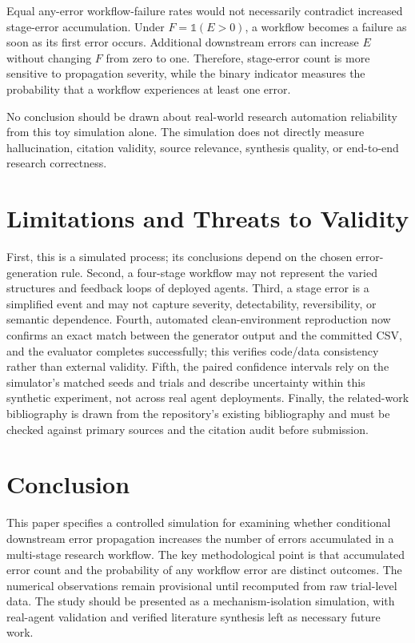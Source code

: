 \documentclass[conference]{IEEEtran}
\begin{document}
Equal any-error workflow-failure rates would not necessarily contradict increased stage-error accumulation. Under $F=\mathbb{1}(E>0)$, a workflow becomes a failure as soon as its first error occurs. Additional downstream errors can increase $E$ without changing $F$ from zero to one. Therefore, stage-error count is more sensitive to propagation severity, while the binary indicator measures the probability that a workflow experiences at least one error.

No conclusion should be drawn about real-world research automation reliability from this toy simulation alone. The simulation does not directly measure hallucination, citation validity, source relevance, synthesis quality, or end-to-end research correctness.

\section{Limitations and Threats to Validity}
First, this is a simulated process; its conclusions depend on the chosen error-generation rule. Second, a four-stage workflow may not represent the varied structures and feedback loops of deployed agents. Third, a stage error is a simplified event and may not capture severity, detectability, reversibility, or semantic dependence. Fourth, automated clean-environment reproduction now confirms an exact match between the generator output and the committed CSV, and the evaluator completes successfully; this verifies code/data consistency rather than external validity. Fifth, the paired confidence intervals rely on the simulator's matched seeds and trials and describe uncertainty within this synthetic experiment, not across real agent deployments. Finally, the related-work bibliography is drawn from the repository's existing bibliography and must be checked against primary sources and the citation audit before submission.

\section{Conclusion}
This paper specifies a controlled simulation for examining whether conditional downstream error propagation increases the number of errors accumulated in a multi-stage research workflow. The key methodological point is that accumulated error count and the probability of any workflow error are distinct outcomes. The numerical observations remain provisional until recomputed from raw trial-level data. The study should be presented as a mechanism-isolation simulation, with real-agent validation and verified literature synthesis left as necessary future work.
\end{document}
